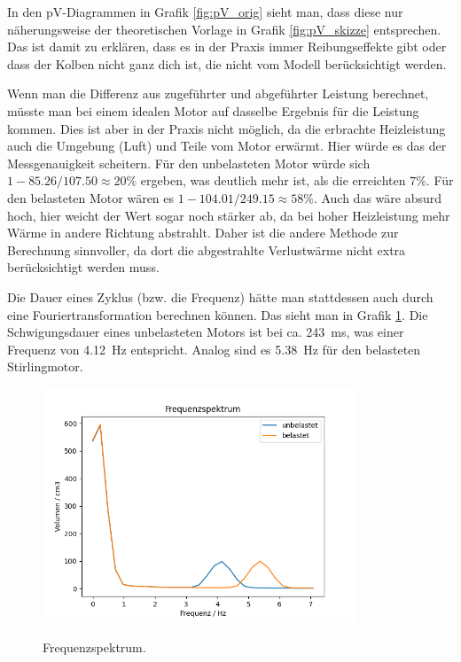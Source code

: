 \documentclass{article}
\begin{document}
In den pV-Diagrammen in Grafik \ref{fig:pV_orig} sieht man, dass diese nur näherungsweise der theoretischen Vorlage in Grafik \ref{fig:pV_skizze} entsprechen. Das ist damit zu erklären, dass es in der Praxis immer Reibungseffekte gibt oder dass der Kolben nicht ganz dich ist, die nicht vom Modell berücksichtigt werden.

Wenn man die Differenz aus zugeführter und abgeführter Leistung berechnet, müsste man bei einem idealen Motor auf dasselbe Ergebnis für die Leistung kommen. Dies ist aber in der Praxis nicht möglich, da die erbrachte Heizleistung auch die Umgebung (Luft) und Teile vom Motor erwärmt. Hier würde es das der Messgenauigkeit scheitern. Für den unbelasteten Motor würde sich $1- 85.26/107.50 \approx 20\%$ ergeben, was deutlich mehr ist, als die erreichten $7\%$. Für den belasteten Motor wären es $1- 104.01/249.15 \approx 58\%$. Auch das wäre absurd hoch, hier weicht der Wert sogar noch stärker ab, da bei hoher Heizleistung mehr Wärme in andere Richtung abstrahlt. Daher ist die andere Methode zur Berechnung sinnvoller, da dort die abgestrahlte Verlustwärme nicht extra berücksichtigt werden muss.


Die Dauer eines Zyklus (bzw. die Frequenz) hätte man stattdessen auch durch eine Fouriertransformation berechnen können. Das sieht man in Grafik \ref{fig:fourier}. Die Schwigungsdauer eines unbelasteten Motors ist bei ca. 243~ms, was einer Frequenz von 4.12~Hz entspricht. Analog sind es 5.38~Hz für den belasteten Stirlingmotor. 


\begin{figure}[H]
\caption{Frequenzspektrum.}
\includegraphics[height=7cm]{graphics/freq.png}
\label{fig:fourier}
\end{figure}
\end{document}
